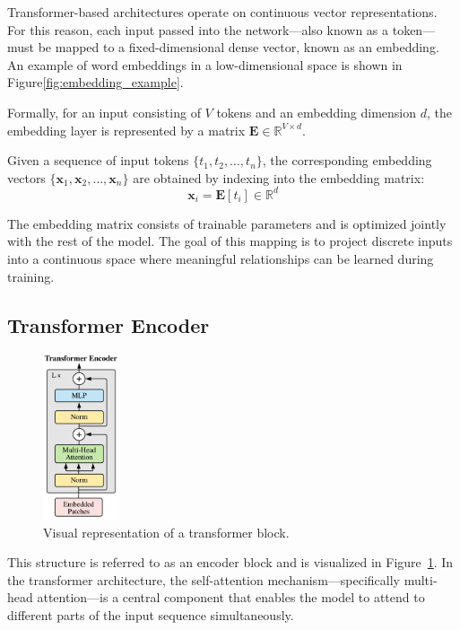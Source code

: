 \documentclass{pracalicmgr}
\begin{document}
Transformer-based architectures operate on continuous vector representations. For this reason, each input passed into the network—also known as a token—must be mapped to a fixed-dimensional dense vector, known as an embedding. An example of word embeddings in a low-dimensional space is shown in Figure\ref{fig:embedding_example}.

Formally, for an input consisting of \( V \) tokens and an embedding dimension \( d \), the embedding layer is represented by a matrix \( \mathbf{E} \in \mathbb{R}^{V \times d} \).

Given a sequence of input tokens \( \{t_1, t_2, \ldots, t_n\} \), the corresponding embedding vectors \( \{\mathbf{x}_1, \mathbf{x}_2, \ldots, \mathbf{x}_n\} \) are obtained by indexing into the embedding matrix:
\[
\mathbf{x}_i = \mathbf{E}[t_i] \in \mathbb{R}^d
\]

The embedding matrix consists of trainable parameters and is optimized jointly with the rest of the model. The goal of this mapping is to project discrete inputs into a continuous space where meaningful relationships can be learned during training.
\subsection{Transformer Encoder}

\begin{figure}[h]
    \centering
    \includegraphics[width=0.2\textwidth]{src/transformerEncoder.pdf}
    \caption{Visual representation of a transformer block.}
    \label{fig:transformerEncoder}
\end{figure}

This structure is referred to as an encoder block and is visualized in Figure~\ref{fig:transformerEncoder}. In the transformer architecture, the self-attention mechanism—specifically multi-head attention—is a central component that enables the model to attend to different parts of the input sequence simultaneously.
\end{document}
